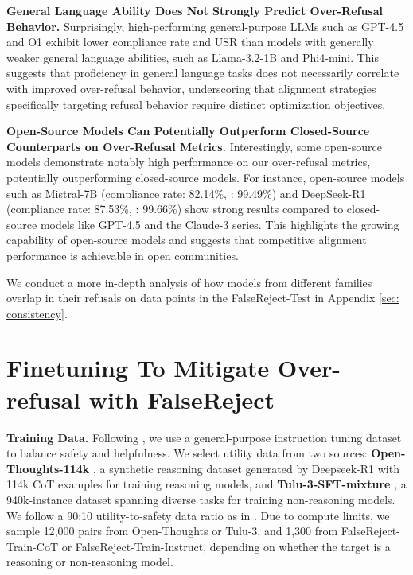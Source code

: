 \documentclass{article} %
\begin{document}
\textbf{General Language Ability Does Not Strongly Predict Over-Refusal Behavior.} Surprisingly, high-performing general-purpose LLMs such as GPT-4.5 and O1 exhibit lower compliance rate and USR than models with generally weaker general language abilities, such as Llama-3.2-1B and Phi4-mini. This suggests that proficiency in general language tasks does not necessarily correlate with improved over-refusal behavior, underscoring that alignment strategies specifically targeting refusal behavior require distinct optimization objectives.

\textbf{Open-Source Models Can Potentially Outperform Closed-Source Counterparts on Over-Refusal Metrics.} Interestingly, some open-source models demonstrate notably high performance on our over-refusal metrics, potentially outperforming closed-source models. For instance, open-source models such as Mistral-7B (compliance rate: 82.14\%, : 99.49\%) and DeepSeek-R1 (compliance rate: 87.53\%, : 99.66\%) show strong results compared to closed-source models like GPT-4.5 and the Claude-3 series. This highlights the growing capability of open-source models and suggests that competitive alignment performance is achievable in open communities.

We conduct a more in-depth analysis of how models from different families overlap in their refusals on data points in the FalseReject-Test in Appendix \ref{sec: consistency}.

\section{Finetuning To Mitigate Over-refusal with FalseReject}


\textbf{Training Data.} Following \citet{brahman2024art, zhang2024backtracking}, we use a general-purpose instruction tuning dataset to balance safety and helpfulness. We select utility data from two sources: \textbf{Open-Thoughts-114k} \citep{openthoughts}, a synthetic reasoning dataset generated by Deepseek-R1 \citep{guo2025deepseek} with 114k CoT examples for training reasoning models, and \textbf{Tulu-3-SFT-mixture} \citep{lambert2024t}, a 940k-instance dataset spanning diverse tasks for training non-reasoning models. We follow a 90:10 utility-to-safety data ratio as in \citet{zhang2024backtracking}. Due to compute limits, we sample 12,000 pairs from Open-Thoughts or Tulu-3, and 1,300 from FalseReject-Train-CoT or FalseReject-Train-Instruct, depending on whether the target is a reasoning or non-reasoning model.
\end{document}

